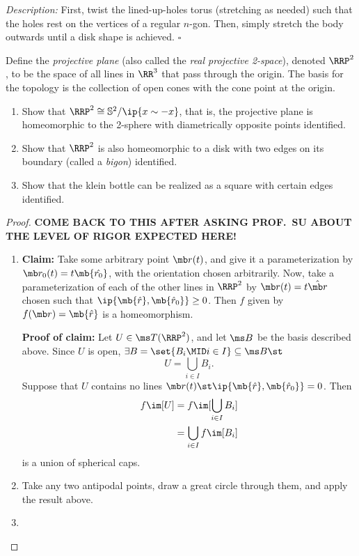 \noindent \emph{Description:} First, twist the lined-up-holes torus (stretching
as needed) such that the holes rest on the vertices of a regular $n$-gon. Then,
simply stretch the body outwards until a disk shape is achieved. \hfill $\square$
\begin{definition}
  Define the \emph{projective plane} (also called the \emph{real projective
    2-space}), denoted $\RRP^2$, to be the space of all lines in $\RR^3$ that
  pass through the origin. The basis for the topology is the collection of open
  cones with the cone point at the origin.
\end{definition}
\begin{problem}[12.3]
  \begin{enumerate}
    \item Show that $\RRP^2 \cong \mathbb{S}^2/\ip{x \sim -x}$, that is, the
      projective plane is homeomorphic to the 2-sphere with diametrically
      opposite points identified.
    \item Show that $\RRP^2$ is also homeomorphic to a disk with two edges on
      its boundary (called a \emph{bigon}) identified.
    \item Show that the klein bottle can be realized as a square with certain
      edges identified.
  \end{enumerate}
\end{problem}
\begin{proof}
  \textbf{COME BACK TO THIS AFTER ASKING PROF.\ SU ABOUT THE LEVEL OF RIGOR
    EXPECTED HERE!}
  \begin{enumerate}
    \item \textbf{Claim:} Take some arbitrary point $\mb r(t)$, and give it a
      parameterization by $\mb r_0(t) = t \mb{\hat{r_0}}$, with the orientation
      chosen arbitrarily. Now, take a parameterization of each of the other
      lines in $\RRP^2$ by $\mb r(t) = t \hat{\mb r}$ chosen such that
      $\ip{\mb{\hat r}, \mb{\hat{r}_0}} \geq 0$. Then $f$ given by $f(\mb r) =
      \mb{\hat{r}}$ is a homeomorphism.

      \textbf{Proof of claim:} Let $U \in \ms T(\RRP^2)$, and let $\ms B$ be the
      basis described above. Since $U$ is open, $\exists B = \set{B_i \MID i \in
        I} \subseteq \ms B \st$
      \[
        U = \bigcup_{i \in I} B_i.
      \]
      Suppose that $U$ contains no lines $\mb r(t) \st \ip{\mb{\hat r},
        \mb{\hat{r}_0}} = 0$. Then
      \begin{align*}
        f\im[U]
        &= f\im[\bigcup_{i \in I}B_i] \\
        &= \bigcup_{i \in I} f\im[B_i]
      \end{align*}
      is a union of spherical caps.
    \item Take any two antipodal points, draw a great circle through them, and
      apply the result above.
    \item
  \end{enumerate}
\end{proof}

